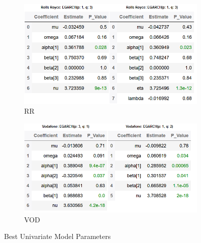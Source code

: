 \begin{figure}[hbt!]
\begin{subfigure}{.49\linewidth}
  \includegraphics[width=\linewidth]{images/parameters/rr.png}
  \caption{RR}
  \label{fig:C}
\end{subfigure} %
\begin{subfigure}{.49\linewidth}
  \includegraphics[width=\linewidth]{images/parameters/vod.png}
  \caption{VOD}
  \label{fig:D}
\end{subfigure}
\caption{Best Univariate Model Parameters}
\end{figure}

